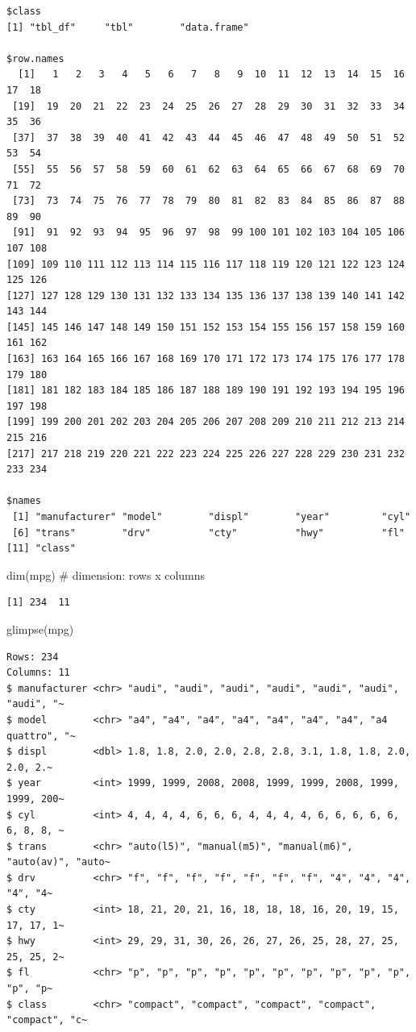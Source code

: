 \documentclass[
  letterpaper,
  DIV=11,
  numbers=noendperiod]{scrartcl}
\newenvironment{Shaded}{\begin{snugshade}}{\end{snugshade}}
\newcommand{\CommentTok}[1]{\textcolor[rgb]{0.37,0.37,0.37}{#1}}
\newcommand{\FunctionTok}[1]{\textcolor[rgb]{0.28,0.35,0.67}{#1}}
\newcommand{\NormalTok}[1]{\textcolor[rgb]{0.00,0.23,0.31}{#1}}
\begin{document}
\begin{verbatim}
$class
[1] "tbl_df"     "tbl"        "data.frame"

$row.names
  [1]   1   2   3   4   5   6   7   8   9  10  11  12  13  14  15  16  17  18
 [19]  19  20  21  22  23  24  25  26  27  28  29  30  31  32  33  34  35  36
 [37]  37  38  39  40  41  42  43  44  45  46  47  48  49  50  51  52  53  54
 [55]  55  56  57  58  59  60  61  62  63  64  65  66  67  68  69  70  71  72
 [73]  73  74  75  76  77  78  79  80  81  82  83  84  85  86  87  88  89  90
 [91]  91  92  93  94  95  96  97  98  99 100 101 102 103 104 105 106 107 108
[109] 109 110 111 112 113 114 115 116 117 118 119 120 121 122 123 124 125 126
[127] 127 128 129 130 131 132 133 134 135 136 137 138 139 140 141 142 143 144
[145] 145 146 147 148 149 150 151 152 153 154 155 156 157 158 159 160 161 162
[163] 163 164 165 166 167 168 169 170 171 172 173 174 175 176 177 178 179 180
[181] 181 182 183 184 185 186 187 188 189 190 191 192 193 194 195 196 197 198
[199] 199 200 201 202 203 204 205 206 207 208 209 210 211 212 213 214 215 216
[217] 217 218 219 220 221 222 223 224 225 226 227 228 229 230 231 232 233 234

$names
 [1] "manufacturer" "model"        "displ"        "year"         "cyl"         
 [6] "trans"        "drv"          "cty"          "hwy"          "fl"          
[11] "class"       
\end{verbatim}

\begin{Shaded}
\begin{Highlighting}[]
\FunctionTok{dim}\NormalTok{(mpg) }\CommentTok{\# dimension: rows x columns}
\end{Highlighting}
\end{Shaded}

\begin{verbatim}
[1] 234  11
\end{verbatim}

\begin{Shaded}
\begin{Highlighting}[]
\FunctionTok{glimpse}\NormalTok{(mpg) }
\end{Highlighting}
\end{Shaded}

\begin{verbatim}
Rows: 234
Columns: 11
$ manufacturer <chr> "audi", "audi", "audi", "audi", "audi", "audi", "audi", "~
$ model        <chr> "a4", "a4", "a4", "a4", "a4", "a4", "a4", "a4 quattro", "~
$ displ        <dbl> 1.8, 1.8, 2.0, 2.0, 2.8, 2.8, 3.1, 1.8, 1.8, 2.0, 2.0, 2.~
$ year         <int> 1999, 1999, 2008, 2008, 1999, 1999, 2008, 1999, 1999, 200~
$ cyl          <int> 4, 4, 4, 4, 6, 6, 6, 4, 4, 4, 4, 6, 6, 6, 6, 6, 6, 8, 8, ~
$ trans        <chr> "auto(l5)", "manual(m5)", "manual(m6)", "auto(av)", "auto~
$ drv          <chr> "f", "f", "f", "f", "f", "f", "f", "4", "4", "4", "4", "4~
$ cty          <int> 18, 21, 20, 21, 16, 18, 18, 18, 16, 20, 19, 15, 17, 17, 1~
$ hwy          <int> 29, 29, 31, 30, 26, 26, 27, 26, 25, 28, 27, 25, 25, 25, 2~
$ fl           <chr> "p", "p", "p", "p", "p", "p", "p", "p", "p", "p", "p", "p~
$ class        <chr> "compact", "compact", "compact", "compact", "compact", "c~
\end{verbatim}
\end{document}
